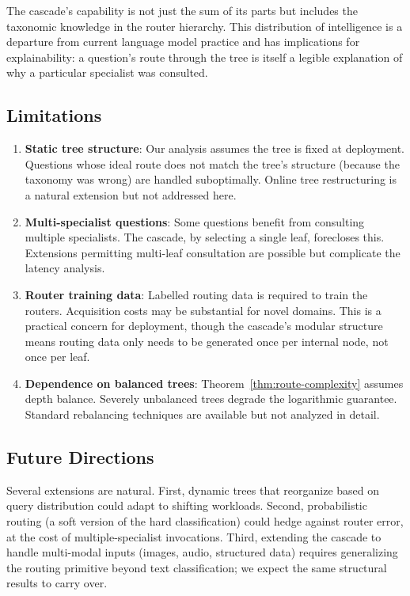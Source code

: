 \documentclass[11pt,a4paper]{article}
\theoremstyle{definition}
\theoremstyle{remark}
\begin{document}
The cascade's capability is not just the sum of its parts but includes the taxonomic knowledge in the router hierarchy. This distribution of intelligence is a departure from current language model practice and has implications for explainability: a question's route through the tree is itself a legible explanation of why a particular specialist was consulted.

\subsection{Limitations}

\begin{enumerate}
    \item \textbf{Static tree structure}: Our analysis assumes the tree is fixed at deployment. Questions whose ideal route does not match the tree's structure (because the taxonomy was wrong) are handled suboptimally. Online tree restructuring is a natural extension but not addressed here.

    \item \textbf{Multi-specialist questions}: Some questions benefit from consulting multiple specialists. The cascade, by selecting a single leaf, forecloses this. Extensions permitting multi-leaf consultation are possible but complicate the latency analysis.

    \item \textbf{Router training data}: Labelled routing data is required to train the routers. Acquisition costs may be substantial for novel domains. This is a practical concern for deployment, though the cascade's modular structure means routing data only needs to be generated once per internal node, not once per leaf.

    \item \textbf{Dependence on balanced trees}: Theorem~\ref{thm:route-complexity} assumes depth balance. Severely unbalanced trees degrade the logarithmic guarantee. Standard rebalancing techniques are available but not analyzed in detail.
\end{enumerate}

\subsection{Future Directions}

Several extensions are natural. First, dynamic trees that reorganize based on query distribution could adapt to shifting workloads. Second, probabilistic routing (a soft version of the hard classification) could hedge against router error, at the cost of multiple-specialist invocations. Third, extending the cascade to handle multi-modal inputs (images, audio, structured data) requires generalizing the routing primitive beyond text classification; we expect the same structural results to carry over.
\end{document}
